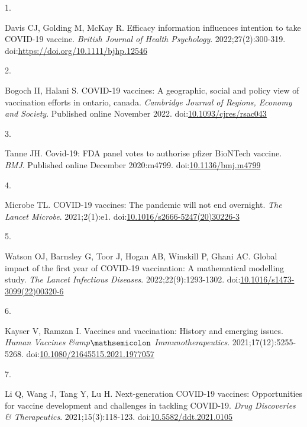 \documentclass[
  letterpaper,
  DIV=11,
  numbers=noendperiod]{scrartcl}
\newlength{\cslhangindent}
\newlength{\csllabelwidth}
\newlength{\cslentryspacingunit} %
\newenvironment{CSLReferences}[2] %
 {%
  \setlength{\parindent}{0pt}
  \ifodd #1
  \let\oldpar\par
  \def\par{\hangindent=\cslhangindent\oldpar}
  \fi
  \setlength{\parskip}{#2\cslentryspacingunit}
 }%
 {}
\newcommand{\CSLLeftMargin}[1]{\parbox[t]{\csllabelwidth}{#1}}
\newcommand{\CSLRightInline}[1]{\parbox[t]{\linewidth - \csllabelwidth}{#1}\break}
\begin{document}
\hypertarget{refs}{}
\begin{CSLReferences}{0}{0}
\leavevmode{}%
\CSLLeftMargin{1. }%
\CSLRightInline{Davis CJ, Golding M, McKay R. Efficacy information
influences intention to take COVID-19 vaccine. \emph{British Journal of
Health Psychology}. 2022;27(2):300-319.
doi:\url{https://doi.org/10.1111/bjhp.12546}}

\leavevmode{}%
\CSLLeftMargin{2. }%
\CSLRightInline{Bogoch II, Halani S. {COVID}-19 vaccines: A geographic,
social and policy view of vaccination efforts in ontario, canada.
\emph{Cambridge Journal of Regions, Economy and Society}. Published
online November 2022.
doi:\href{https://doi.org/10.1093/cjres/rsac043}{10.1093/cjres/rsac043}}

\leavevmode{}%
\CSLLeftMargin{3. }%
\CSLRightInline{Tanne JH. Covid-19: {FDA} panel votes to authorise
pfizer {BioNTech} vaccine. \emph{{BMJ}}. Published online December
2020:m4799.
doi:\href{https://doi.org/10.1136/bmj.m4799}{10.1136/bmj.m4799}}

\leavevmode{}%
\CSLLeftMargin{4. }%
\CSLRightInline{Microbe TL. {COVID}-19 vaccines: The pandemic will not
end overnight. \emph{The Lancet Microbe}. 2021;2(1):e1.
doi:\href{https://doi.org/10.1016/s2666-5247(20)30226-3}{10.1016/s2666-5247(20)30226-3}}

\leavevmode{}%
\CSLLeftMargin{5. }%
\CSLRightInline{Watson OJ, Barnsley G, Toor J, Hogan AB, Winskill P,
Ghani AC. Global impact of the first year of {COVID}-19 vaccination: A
mathematical modelling study. \emph{The Lancet Infectious Diseases}.
2022;22(9):1293-1302.
doi:\href{https://doi.org/10.1016/s1473-3099(22)00320-6}{10.1016/s1473-3099(22)00320-6}}

\leavevmode{}%
\CSLLeftMargin{6. }%
\CSLRightInline{Kayser V, Ramzan I. Vaccines and vaccination: History
and emerging issues. \emph{Human Vaccines {\&}amp\(\mathsemicolon\)
Immunotherapeutics}. 2021;17(12):5255-5268.
doi:\href{https://doi.org/10.1080/21645515.2021.1977057}{10.1080/21645515.2021.1977057}}

\leavevmode{}%
\CSLLeftMargin{7. }%
\CSLRightInline{Li Q, Wang J, Tang Y, Lu H. Next-generation COVID-19
vaccines: Opportunities for vaccine development and challenges in
tackling COVID-19. \emph{Drug Discoveries \& Therapeutics}.
2021;15(3):118-123.
doi:\href{https://doi.org/10.5582/ddt.2021.0105}{10.5582/ddt.2021.0105}}


\end{CSLReferences}
\end{document}

